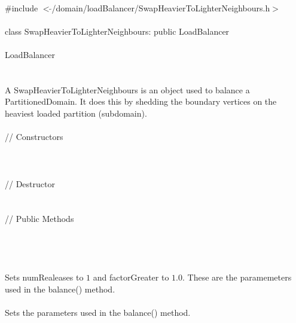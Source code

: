 
   \\
\indent \#include $<\tilde{ }$/domain/loadBalancer/SwapHeavierToLighterNeighbours.h$>$  \\

  \\
\indent class SwapHeavierToLighterNeighbours: public LoadBalancer \\

 \\
\indent  LoadBalancer \\
\indent{} \\


  \\
\indent A SwapHeavierToLighterNeighbours is an object used to balance a
PartitionedDomain. It does this by shedding the boundary vertices on
the heaviest loaded partition (subdomain). \\

  \\
\indent\indent  // Constructors  \\
\indent{}\\ 
\indent{} \\ \\
\indent\indent // Destructor  \\
\indent{}  \\ \\
\indent\indent // Public Methods  \\
\indent{} \\ \\


\\
\\ 
Sets \p numRealeases to $1$ and \p factorGreater to $1.0$. These
are the paramemeters used in the balance() method. \\

\\ 
Sets the parameters used in the balance() method. \\

